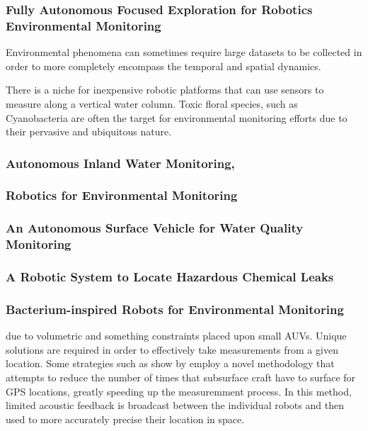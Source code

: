 \subsubsection*{ Fully Autonomous Focused Exploration for Robotics Environmental Monitoring \cite{Hitz2001} } 

Environmental phenomena can sometimes require large datasets to be collected in order to more completely encompass the temporal and spatial dynamics. 

There is a niche for inexpensive robotic platforms that can use sensors to measure along a vertical water column. Toxic floral species, such as Cyanobacteria are often the target for environmental monitoring efforts due to their pervasive and ubiquitous nature. 


\subsubsection*{ Autonomous Inland Water Monitoring, \cite{Hitz2012} } 

\subsubsection*{ Robotics for Environmental Monitoring \cite{Dunbabin2012} } 

\subsubsection*{ An Autonomous Surface Vehicle for Water Quality Monitoring \cite{Dunbabin2009} } 

\subsubsection*{ A Robotic System to Locate Hazardous Chemical Leaks \cite{Russell2014}} 

\subsubsection*{ Bacterium-inspired Robots for Environmental Monitoring \cite{Dhariwal2004} }


\cite{Seto2016} due to volumetric and something constraints placed upon small AUVs. Unique solutions are required in order to effectively take measurements from a given location. Some strategies such as show by \cite{Seto2016} employ a novel methodology that attempts to reduce the number of times that subsurface craft have to surface for GPS locations, greatly speeding up the measuremment process. In this method, limited acoustic feedback is broadcast between the individual robots and then used to more accurately precise their location in space. 